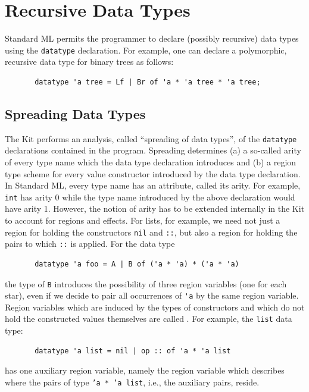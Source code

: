 \documentclass[12pt]{book}
\begin{document}
\chapter{Recursive Data Types}
\label{datatypes.sec}
Standard ML permits the programmer to declare (possibly recursive) data types 
using the {\tt datatype} declaration. For example, one can declare a polymorphic, recursive
data type for binary trees as follows:
\begin{verbatim}
       datatype 'a tree = Lf | Br of 'a * 'a tree * 'a tree;
\end{verbatim}
\section{Spreading Data Types}
The Kit performs an analysis, called ``spreading of data types'',
of the {\tt datatype} declarations contained in the program. Spreading
determines  (a) a so-called arity of every type name
which the data type declaration introduces and (b) a region type scheme for
every value constructor introduced by the data type declaration. In Standard ML,
every type name has an attribute, called its arity. For example, {\tt int} has
arity 0 while the type name introduced by the above declaration would have
arity 1. However, the notion of arity has to be extended internally in the Kit to account for regions
and effects. For lists, for example, we need not just a region for holding the constructors
{\tt nil} and {\tt ::}, but also a region for holding the pairs to which {\tt ::} is
applied. For the data type
\begin{verbatim}
       datatype 'a foo = A | B of ('a * 'a) * ('a * 'a)
\end{verbatim}
the type of {\tt B} introduces the possibility of three region variables
(one for each star), even if we decide to pair all occurrences of \verb+'a+
by the same region variable. Region variables which are induced by the types
of constructors and which do not hold the constructed values themselves are called
. For example,
the {\tt list} data type:
\begin{verbatim}
       datatype 'a list = nil | op :: of 'a * 'a list
\end{verbatim}
has one auxiliary region variable, namely the region variable which
describes where the pairs of type {\tt 'a * 'a list}, i.e., the auxiliary
pairs, reside.
\end{document}
